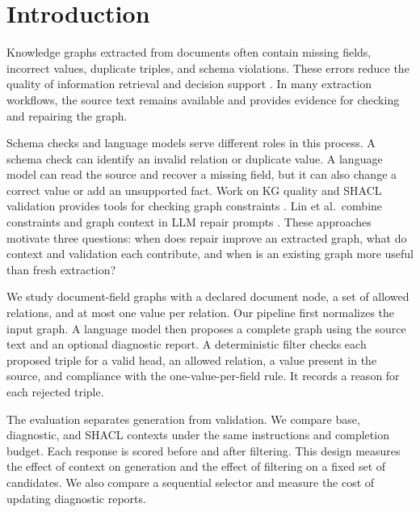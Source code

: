 \section{Introduction}
\label{sec:introduction}

Knowledge graphs extracted from documents often contain missing fields,
incorrect values, duplicate triples, and schema violations. These errors
reduce the quality of information retrieval and decision support
\citep{ref_ji2021,ref_paulheim2017}. In many extraction workflows, the source
text remains available and provides evidence for checking and repairing the
graph.

Schema checks and language models serve different roles in this process.
A schema check can identify an invalid relation or duplicate value. A language
model can read the source and recover a missing field, but it can also change
a correct value or add an unsupported fact. Work on KG quality and SHACL
validation provides tools for checking graph constraints
\citep{ref_zaveri2016,ref_kontokostas2014,ref_shacl2017}. Lin et al.\ combine
constraints and graph context in LLM repair prompts \citep{ref_lin2025}.
These approaches motivate three questions: when does repair improve an
extracted graph, what do context and validation each contribute, and when is
an existing graph more useful than fresh extraction?

We study document-field graphs with a declared document node, a set of allowed
relations, and at most one value per relation. Our pipeline first normalizes
the input graph. A language model then proposes a complete graph using the
source text and an optional diagnostic report. A deterministic filter checks
each proposed triple for a valid head, an allowed relation, a value present in
the source, and compliance with the one-value-per-field rule. It records a
reason for each rejected triple.

The evaluation separates generation from validation. We compare base,
diagnostic, and SHACL contexts under the same instructions and completion
budget. Each response is scored before and after filtering. This design
measures the effect of context on generation and the effect of filtering on a
fixed set of candidates. We also compare a sequential selector and measure the
cost of updating diagnostic reports.

